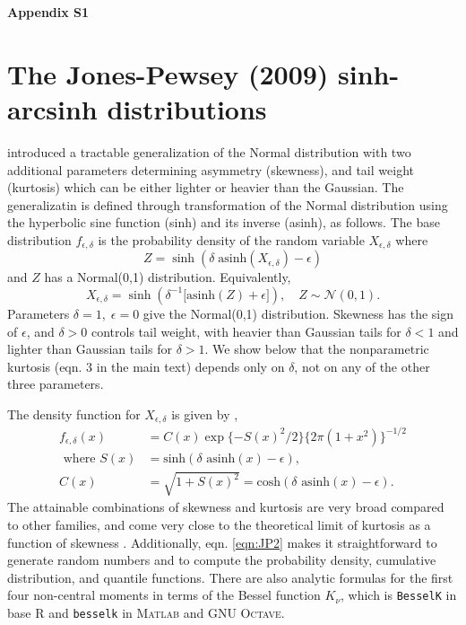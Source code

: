 \documentclass[12pt]{article}
\newcommand{\be}{\begin{equation}}
\newcommand{\ee}{\end{equation}}
\begin{document}
\newpage 
\clearpage 
\appendix



\begin{spacing}{1.35} 

	\centerline{\Large{\textbf{Appendix S1}}}
	\renewcommand{\thetable}{S-\arabic{table}}
	\renewcommand{\thefigure}{S-\arabic{figure}}
	\renewcommand{\thesection}{S.\arabic{section}}
	\renewcommand{\theequation}{S\arabic{equation}}
	\setcounter{page}{1}
	\setcounter{equation}{0}
	\setcounter{figure}{0}
	\setcounter{section}{0}
	\setcounter{table}{0}
	\section{The Jones-Pewsey (2009) sinh-arcsinh distributions}
	\citet{jones-pewsey-2009} introduced a tractable generalization of the Normal distribution with two 
	additional parameters determining asymmetry (skewness), and tail weight (kurtosis) which can be either 
	lighter or heavier than the Gaussian. The generalizatin is defined through transformation of the
	Normal distribution using the hyperbolic sine function (sinh) and its inverse (asinh), 
	as follows. The base distribution $f_{\epsilon,\delta}$  is the 
	probability density of the random variable $X_{\epsilon,\delta}$ where  
	\be
	Z = \sinh (\delta \; \mbox{asinh}(X_{\epsilon,\delta}) - \epsilon)
	\label{eqn:JP1}
	\ee
	and $Z$ has a Normal(0,1) distribution. Equivalently, 
	\be
	X_{\epsilon,\delta} = \sinh \left( \delta^{-1} \big[\mbox{asinh}(Z) + \epsilon \big] \right), \quad Z \sim \mathcal{N}(0,1).
	\label{eqn:JP2}
	\ee
	Parameters $\delta=1, \; \epsilon=0$ give the Normal(0,1) distribution. Skewness has the sign of $\epsilon$, and
	$\delta > 0$ controls tail weight, with heavier than Gaussian tails for $\delta<1$ and lighter than Gaussian tails for $\delta > 1$. We show below that the nonparametric kurtosis (eqn. 3 in the main text) depends 
	only on $\delta$, not on any of the other three parameters. 
	
	The density function for $X_{\epsilon,\delta}$ is given by \citet[][eqn. 2]{jones-pewsey-2009}, 
	\be
	\begin{aligned}
		f_{ \epsilon,\delta}(x) & = C(x) \exp\{-S(x)^2/2\} \{2\pi(1+x^2)\}^{-1/2}  \\
		\mbox{ where }  S(x) & =  \mbox{sinh}(\delta \mbox{ asinh}(x)- \epsilon), \\
		C(x)  & =  \sqrt{1 + S(x)^2} = \mbox{cosh}(\delta \mbox{ asinh}(x)- \epsilon).
	\end{aligned} 
	\ee
	The attainable combinations of skewness and kurtosis are 
	very broad compared to other families, and come very close to the theoretical limit of
	kurtosis as a function of skewness \citep[][Fig.  2]{jones-pewsey-2009}. 
	Additionally, eqn. \eqref{eqn:JP2} makes it straightforward to generate random numbers and to compute 
	the probability density, cumulative distribution, and quantile functions. 
	There are also analytic formulas for the first four non-central 
	moments \citep[][p. 764]{jones-pewsey-2009} in terms of the Bessel function $K_{\nu}$, which is
	\texttt{BesselK} in base R and \texttt{besselk} in \textsc{Matlab} and GNU \textsc{Octave}.
	

\end{spacing}
\end{document}
